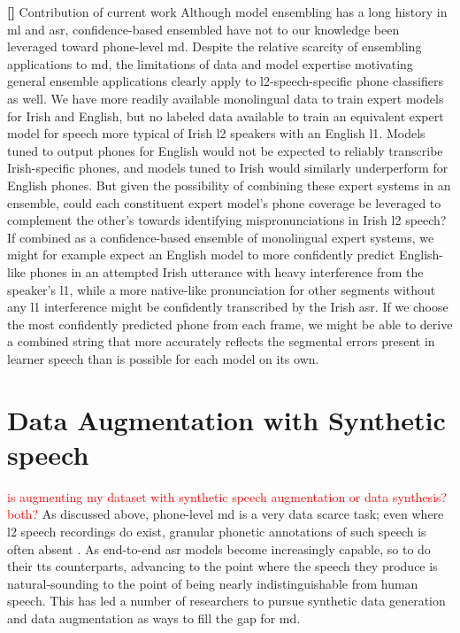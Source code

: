 \documentclass[thesis]{cluu}
\newcounter{paranum}
\newcommand{\numberedparagraph}{\par\refstepcounter{paranum}\textbf{[\theparanum] }}
\newcommand{\todo}[1]{\textcolor{red}{#1}}
\begin{document}
\numberedparagraph{Contribution of current work}
Although model ensembling has a long history in \gls{ml} and \gls{asr}, confidence-based ensembled have not to our knowledge been leveraged toward phone-level \gls{md}. Despite the relative scarcity of ensembling applications to \gls{md}, the limitations of data and model expertise motivating general ensemble applications clearly apply to \gls{l2}-speech-specific phone classifiers as well. We have more readily available monolingual data to train expert models for Irish and English, but no labeled data available to train an equivalent expert model for speech more typical of Irish \gls{l2} speakers with an English \gls{l1}. Models tuned to output phones for English would not be expected to reliably transcribe Irish-specific phones, and models tuned to Irish would similarly underperform for English phones. But given the possibility of combining these expert systems in an ensemble, could each constituent expert model's phone coverage be leveraged to complement the other's towards identifying mispronunciations in Irish \gls{l2} speech? If combined as a confidence-based ensemble of monolingual expert systems, we might for example expect an English model to more confidently predict English-like phones in an attempted Irish utterance with heavy interference from the speaker's \gls{l1}, while a more native-like pronunciation for other segments without any \gls{l1} interference might be confidently transcribed by the Irish \gls{asr}. If we choose the most confidently predicted phone from each frame, we might be able to derive a combined string that more accurately reflects the segmental errors present in learner speech than is possible for each model on its own. 

\section{Data Augmentation with Synthetic speech}
\todo{is augmenting my dataset with synthetic speech augmentation or data synthesis? both?}
As discussed above, phone-level \gls{md} is a very data scarce task; even where \gls{l2} speech recordings do exist, granular phonetic annotations of such speech is often absent \parencite{zhangL2GENNeuralPhoneme2022}. As end-to-end \gls{asr} models become increasingly capable, so to do their \gls{tts} counterparts, advancing to the point where the speech they produce is natural-sounding to the point of being nearly indistinguishable from human speech. This has led a number of researchers to pursue synthetic data generation and data augmentation as ways to fill the gap for \gls{md}. 
\end{document}
